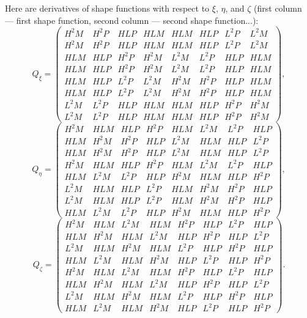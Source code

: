\documentclass{article}
\begin{document}
Here are derivatives of shape functions with respect to $\xi$, $\eta$, and
$\zeta$ (first column --- first shape function, second column --- second shape
function...):
\begin{equation}
  Q_{\xi} = \left(\begin{array}{llllllll}
    H^2 M & H^2 P & HLP & HLM & HLM & HLP & L^2 P & L^2 M\\
    H^2 M & H^2 P & HLP & HLM & HLM & HLP & L^2 P & L^2 M\\
    HLM & HLP & H^2 P & H^2 M & L^2 M & L^2 P & HLP & HLM\\
    HLM & HLP & H^2 P & H^2 M & L^2 M & L^2 P & HLP & HLM\\
    HLM & HLP & L^2 P & L^2 M & H^2 M & H^2 P & HLP & HLM\\
    HLM & HLP & L^2 P & L^2 M & H^2 M & H^2 P & HLP & HLM\\
    L^2 M & L^2 P & HLP & HLM & HLM & HLP & H^2 P & H^2 M\\
    L^2 M & L^2 P & HLP & HLM & HLM & HLP & H^2 P & H^2 M
  \end{array} \right), \label{eq:diffxi}
\end{equation}
\begin{equation}
  Q_{\eta} = \left(\begin{array}{llllllll}
    H^2 M & HLM & HLP & H^2 P & HLM & L^2 M & L^2 P & HLP\\
    HLM & H^2 M & H^2 P & HLP & L^2 M & HLM & HLP & L^2 P\\
    HLM & H^2 M & H^2 P & HLP & L^2 M & HLM & HLP & L^2 P\\
    H^2 M & HLM & HLP & H^2 P & HLM & L^2 M & L^2 P & HLP\\
    HLM & L^2 M & L^2 P & HLP & H^2 M & HLM & HLP & H^2 P\\
    L^2 M & HLM & HLP & L^2 P & HLM & H^2 M & H^2 P & HLP\\
    L^2 M & HLM & HLP & L^2 P & HLM & H^2 M & H^2 P & HLP\\
    HLM & L^2 M & L^2 P & HLP & H^2 M & HLM & HLP & H^2 P
  \end{array} \right), \label{eq:diffeta}
\end{equation}
\begin{equation}
  Q_{\zeta} = \left(\begin{array}{llllllll}
    H^2 M & HLM & L^2 M & HLM & H^2 P & HLP & L^2 P & HLP\\
    HLM & H^2 M & HLM & L^2 M & HLP & H^2 P & HLP & L^2 P\\
    L^2 M & HLM & H^2 M & HLM & L^2 P & HLP & H^2 P & HLP\\
    HLM & L^2 M & HLM & H^2 M & HLP & L^2 P & HLP & H^2 P\\
    H^2 M & HLM & L^2 M & HLM & H^2 P & HLP & L^2 P & HLP\\
    HLM & H^2 M & HLM & L^2 M & HLP & H^2 P & HLP & L^2 P\\
    L^2 M & HLM & H^2 M & HLM & L^2 P & HLP & H^2 P & HLP\\
    HLM & L^2 M & HLM & H^2 M & HLP & L^2 P & HLP & H^2 P
  \end{array} \right) . \label{eq:diffzeta}
\end{equation}
\end{document}
